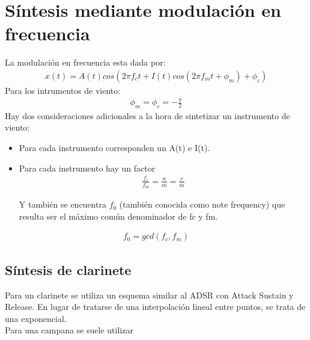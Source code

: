 \documentclass[assd_tp2_main.tex]{subfiles}
\begin{document}
\section{Síntesis mediante modulación en frecuencia}

La modulación en frecuencia esta dada por:
\begin{eqnarray*}
\textstyle x(t)=A(t)cos(2\pi f_c t+I(t)cos(2\pi f_mt+\phi_m)+\phi_c)
\end{eqnarray*}
Para los intrumentos de viento:
\begin{eqnarray*}
\displaystyle \phi_m=\phi_c=-\frac{\pi}{2}
\end{eqnarray*}
Hay dos consideraciones adicionales a la hora de sintetizar un instrumento de viento:
\begin{itemize}
  \item Para cada instrumento corresponden un A(t) e I(t).

  \item Para cada instrumento hay un factor 
\begin{eqnarray*}
\displaystyle \frac{f_c}{f_m}=\frac{n}{m}=\frac{c}{m}
\end{eqnarray*}

Y también se encuentra $f_0$ (también conocida como note frequency) que resulta ser el máximo común denominador de fc y fm.
\end{itemize}

 
\begin{eqnarray*}
\displaystyle f_0=gcd(f_c,f_m)
\end{eqnarray*}
\subsection{Síntesis de clarinete}
Para un clarinete se utiliza un esquema similar al ADSR con Attack Sustain y Release. En lugar de tratarse de una interpolación lineal entre puntos, se trata de una exponencial.
\\
Para una campana se suele utilizar
\end{document}
